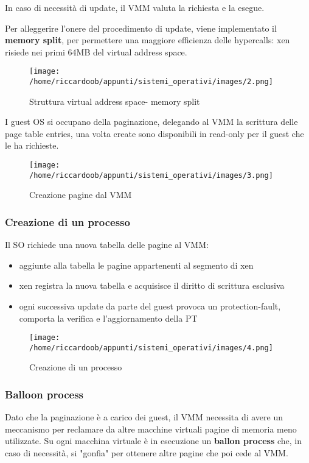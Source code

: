 In caso di necessità di update, il VMM valuta la richiesta e la esegue.

Per alleggerire l'onere del procedimento di update, viene implementato il \textbf{memory split}, per permettere una maggiore efficienza delle hypercalls: xen risiede nei primi 64MB del virtual address space.

\begin{figure}[H]
	\caption{Struttura virtual address space- memory split}
	\centering
	\texttt{[image: /home/riccardoob/appunti/sistemi\_operativi/images/2.png]}
\end{figure}

I guest OS si occupano della paginazione, delegando al VMM la scrittura delle page table entries, una volta create sono disponibili in read-only per il guest che le ha richieste.

\begin{figure}[H]
	\caption{Creazione pagine dal VMM}
	\centering
	\texttt{[image: /home/riccardoob/appunti/sistemi\_operativi/images/3.png]}
\end{figure}

\subsubsection{Creazione di un processo}

Il SO richiede una nuova tabella delle pagine al VMM:\\
\begin{itemize}
	\item aggiunte alla tabella le pagine appartenenti al segmento di xen
	\item xen registra la nuova tabella e acquisisce il diritto di scrittura esclusiva
	\item ogni successiva update da parte del guest provoca un protection-fault, comporta la verifica e l'aggiornamento della PT
\end{itemize}

\begin{figure}[H]
	\caption{Creazione di un processo}
	\centering
	\texttt{[image: /home/riccardoob/appunti/sistemi\_operativi/images/4.png]}
\end{figure}

\subsubsection{Balloon process}
Dato che la paginazione è a carico dei guest, il VMM necessita di avere un meccanismo per reclamare da altre macchine virtuali pagine di memoria meno utilizzate.
Su ogni macchina virtuale è in esecuzione un \textbf{ballon process} che, in caso di necessità, si "gonfia" per ottenere altre pagine che poi cede al VMM.

